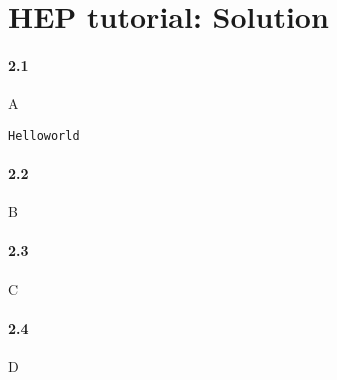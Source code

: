 \documentclass[11pt]{article}
\begin{document}
\setcounter{section}{1}
\section{HEP tutorial: Solution}
\paragraph{2.1}
A

\begin{lstlisting}[emph={if,while,continue,new},emphstyle=\color{nut}]
Helloworld
\end{lstlisting}


\newpage
\paragraph{2.2}
B

\newpage
\paragraph{2.3}
C

\newpage
\paragraph{2.4}
D
\end{document}
